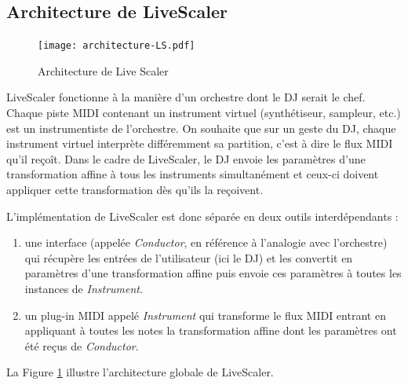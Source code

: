 \subsection{Architecture de LiveScaler}

\begin{figure}[htbp]
  \centering
	\texttt{[image: architecture-LS.pdf]}
  \caption{Architecture de Live Scaler\label{fig:archi}}
\end{figure}

LiveScaler fonctionne à la manière d'un orchestre dont le  DJ serait le chef. Chaque piste MIDI contenant un instrument virtuel (synthétiseur, sampleur, etc.) est un instrumentiste de l'orchestre. On souhaite que sur un geste du DJ, chaque instrument virtuel interprète différemment sa partition, c'est à dire le flux MIDI qu'il reçoît. Dans le cadre de LiveScaler, le DJ envoie les paramètres d'une transformation affine à tous les instruments simultanément et ceux-ci doivent appliquer cette transformation dès qu'ils la reçoivent.

L'implémentation de LiveScaler est donc séparée en deux outils interdépendants : 
\begin{enumerate}
  \item une interface (appelée \emph{Conductor}, en référence à l'analogie avec l'orchestre) qui récupère les entrées de l'utilisateur (ici le DJ) et les convertit en paramètres d'une transformation affine puis envoie ces paramètres à toutes les instances de \emph{Instrument}.
  \item un plug-in MIDI appelé \emph{Instrument} qui transforme le flux MIDI entrant en appliquant à toutes les notes la transformation affine dont les paramètres ont été reçus de \emph{Conductor}.
\end{enumerate}
La Figure \ref{fig:archi} illustre l'architecture globale de LiveScaler.

